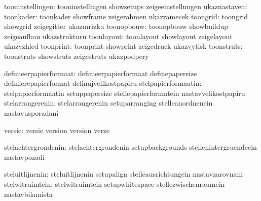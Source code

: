              tooninstellingen:  tooninstellingen             showsetups
                                zeigeeinstellungen           ukaznastaveni
                    toonkader:  toonkader                    showframe
                                zeigerahmen                  ukazramecek
                     toongrid:  toongrid                     showgrid
                                zeigegitter                  ukazmrizku
                   toonopbouw:  toonopbouw                   showbuildup
                                zeigeaufbau                  ukazstrukturu
                   toonlayout:  toonlayout                   showlayout
                                zeigelayout                  ukazvzhled
                    toonprint:  toonprint                    showprint
                                zeigedruck                   ukazvytisk
                   toonstruts:  toonstruts                   showstruts
                                zeigestruts                  ukazpodpery

       definieerpapierformaat:  definieerpapierformaat       definepapersize
                                definierepapierformat        definujvelikostpapiru
          stelpapierformaatin:  stelpapierformaatin          setuppapersize
                                stellepapierformatein        nastavvelikostpapiru
             stelarrangerenin:  stelarrangerenin             setuparranging
                                stelleanordnenein            nastavusporadani


                       versie:  versie                       version
                                version                      verze

          stelachtergrondenin:  stelachtergrondenin          setupbackgrounds
                                stellehintergruendeein       nastavpozadi

              steluitlijnenin:  steluitlijnenin              setupalign
                                stelleausrichtungein         nastavzarovnani
              stelwitruimtein:  stelwitruimtein              setupwhitespace
                                stellezwischenraumein        nastavbilamista

